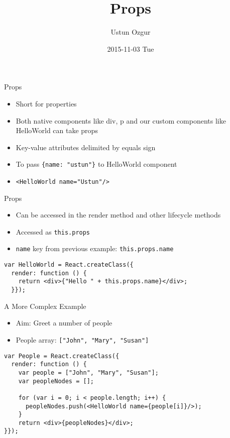 \documentclass[presentation]{beamer}
\author{Ustun Ozgur}
\date{2015-11-03 Tue}
\title{Props}
\begin{document}
\maketitle

\begin{frame}[fragile,label={sec:orgheadline1}]{Props}
 \begin{itemize}
\item Short for properties
\item Both native components like div, p and our custom components like HelloWorld
can take props
\item Key-value attributes delimited by equals sign
\item To pass \texttt{\{name: "ustun"\}} to HelloWorld component
\item \texttt{<HelloWorld name="Ustun"/>}
\end{itemize}
\end{frame}

\begin{frame}[fragile,label={sec:orgheadline2}]{Props}
 \begin{itemize}
\item Can be accessed in the render method and other lifecycle methods
\item Accessed as \texttt{this.props}
\item \texttt{name} key from previous example: \texttt{this.props.name}
\end{itemize}
\begin{verbatim}
var HelloWorld = React.createClass({
  render: function () {
    return <div>{"Hello " + this.props.name}</div>;
  }});
\end{verbatim}
\end{frame}

\begin{frame}[fragile,label={sec:orgheadline3}]{A More Complex Example}
 \begin{itemize}
\item Aim: Greet a number of people
\item People array: \texttt{["John", "Mary", "Susan"]}
\end{itemize}

\begin{verbatim}
var People = React.createClass({
  render: function () {
    var people = ["John", "Mary", "Susan"];
    var peopleNodes = [];

    for (var i = 0; i < people.length; i++) {
      peopleNodes.push(<HelloWorld name={people[i]}/>);
    }
    return <div>{peopleNodes}</div>;
}});
\end{verbatim}
\end{frame}
\end{document}
